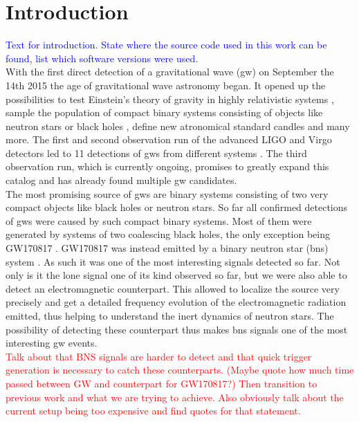\section{Introduction}
\textcolor{Blue}{Text for introduction. State where the source code used in this work can be found, list which software versions were used.}\\
With the first direct detection of a gravitational wave (\gls{gw}) on September the 14th 2015 \cite{gw150914} the age of gravitational wave astronomy began. It opened up the possibilities to test Einstein's theory of gravity in highly relativistic systems \cite{test_gr_gw150914}, sample the population of compact binary systems consisting of objects like neutron stars or black holes \cite{population_binary_systems}, define new atronomical standard candles \cite{standard_candles} and many more. The first and second observation run of the advanced LIGO and Virgo detectors \cite{aligo, avirgo} led to 11 detections of \gls{gw}s from different systems \cite{catalog}. The third observation run, which is currently ongoing, promises to greatly expand this catalog and has already found multiple \gls{gw} candidates.\\
The most promising source of \gls{gw}s are binary systems consisting of two very compact objects like black holes or neutron stars. So far all confirmed detections of \gls{gw}s were caused by such compact binary systems. Most of them were generated by systems of two coalescing black holes, the only exception being GW170817 \cite{catalog}. GW170817 was instead emitted by a binary neutron star (\gls{bns}) system \cite{gw170817}. As such it was one of the most interesting signals detected so far. Not only is it the lone signal one of its kind observed so far, but we were also able to detect an electromagnetic counterpart. This allowed to localize the source very precisely and get a detailed frequency evolution of the electromagnetic radiation emitted, thus helping to understand the inert dynamics of neutron stars. The possibility of detecting these counterpart thus makes \gls{bns} signals one of the most interesting \gls{gw} events.\\
\textcolor{red}{Talk about that BNS signals are harder to detect and that quick trigger generation is necessary to catch these counterparts. (Maybe quote how much time passed between GW and counterpart for GW170817?) Then transition to previous work and what we are trying to achieve. Also obviously talk about the current setup being too expensive and find quotes for that statement.}
